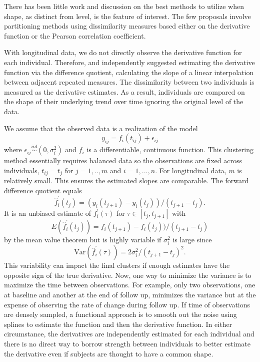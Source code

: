 \documentclass[12pt]{article}
\begin{document}
There has been little work and discussion on the best methods to utilize when shape, as distinct from level, is the feature of interest. The few proposals involve partitioning methods using dissimilarity measures based either on the derivative function or the Pearson correlation coefficient. 

With longitudinal data, we do not directly observe the derivative function for each individual. Therefore, \textcite{moller2003} and \textcite{d2000} independently suggested estimating the derivative function via the difference quotient, calculating the slope of a linear interpolation between adjacent repeated measures. The dissimilarity between two individuals is measured as the derivative estimates. As a result, individuals are compared on the shape of their underlying trend over time ignoring the original level of the data. 

We assume that the observed data is a realization of the model
$$y_{ij}= f_i(t_{ij})+\epsilon_{ij}$$
where $\epsilon_{ij}\overset{iid}{\sim} (0,\sigma_{i}^{2})$ and $f_{i}$ is a differentiable, continuous function. This clustering method essentially requires balanced data so the observations are fixed across individuals, $t_{ij} = t_{j}$ for $j=1,..,m$ and $i=1,...,n$. For longitudinal data, $m$ is relatively small. This ensures the estimated slopes are comparable. The forward difference quotient equals 
$$\hat{f}_{i}^{'}(t_{j}) = (y_i(t_{j+1})-y_i(t_j))/(t_{j+1}-t_j).$$
It is an unbiased estimate of $f_{i}^{'}(\tau)$ for $\tau\in[t_{j},t_{j+1}]$ with
$$E(\hat{f}_{i}^{'}(t_{j})) = f_i(t_{j+1})-f_i(t_j))/(t_{j+1}-t_j)$$
by the mean value theorem but is highly variable if $\sigma_{i}^{2}$ is large since
$$\text{Var}(\hat{f}_{i}^{'}(\tau)) =  2\sigma^{2}_{i}/ (t_{j+1}-t_j)^{2}.$$
This variability can impact the final clusters if enough estimates have the opposite sign of the true derivative. Now, one way to minimize the variance is to maximize the time between observations. For example, only two observations, one at baseline and another at the end of follow up, minimizes the variance but at the expense of observing the rate of change during follow up. If time of observations are densely sampled, a functional approach is to smooth out the noise using splines to estimate the function and then the derivative function. In either circumstance, the derivatives are independently estimated for each individual and there is no direct way to borrow strength between individuals to better estimate the derivative even if subjects are thought to have a common shape. 
\end{document}
